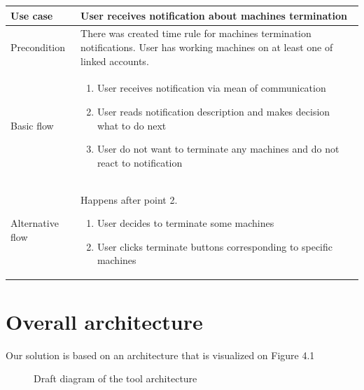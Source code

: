 \documentclass[licencjacka,en]{thesisclass}
\begin{document}
    \begin{center}
      \begin{tabular} {| l | p{13cm} |}
      \hline
      Use case & User receives notification about machines termination \\ \hline
      Precondition & There was created time rule for machines termination notifications. User has working machines on at least one of linked accounts. \\ \hline
      Basic flow &
        \begin{enumerate}
        \item User receives notification via mean of communication
        \item User reads notification description and makes decision what to do next
        \item User do not want to terminate any machines and do not react to notification
        \end{enumerate}
        \\ \hline
      Alternative flow &
        Happens after point 2.
        \begin{enumerate}
        \item User decides to terminate some machines
        \item User clicks terminate buttons corresponding to specific machines
        \end{enumerate}
        \\ \hline
      \end{tabular}
    \end{center}



    \section{Overall architecture}
    Our solution is based on an architecture that is visualized on Figure 4.1

    \begin{figure}[!htb]
      \caption{\label{fig:arch-diag} Draft diagram of the tool architecture}
    \end{figure}
\end{document}
